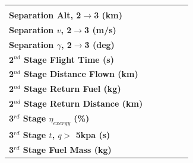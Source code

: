 \begin{table}[ht]
\begin{tabular}{l c c c c c}
		& \textbf{\secondExergyEffMaxTGroundMinTStrat}
		& \textbf{\secondExergyEffMinTGroundMaxTStrat}
		& \textbf{\secondExergyEffMaxTGroundMaxTStrat}
		\\
		\textbf{Separation Alt, 2$\rightarrow$3 (km)}
		& \secondthirdSeparationAltqStandard
		& \secondthirdSeparationAltMinTGroundMinTStrat
		& \secondthirdSeparationAltMaxTGroundMinTStrat
		& \secondthirdSeparationAltMinTGroundMaxTStrat
		& \secondthirdSeparationAltMaxTGroundMaxTStrat
		\\
		\textbf{Separation $v$, 2$\rightarrow$3 (m/s)}
		& \secondthirdSeparationvqStandard
		& \secondthirdSeparationvMinTGroundMinTStrat
		& \secondthirdSeparationvMaxTGroundMinTStrat
		& \secondthirdSeparationvMinTGroundMaxTStrat
		& \secondthirdSeparationvMaxTGroundMaxTStrat
		\\
		\textbf{Separation $\gamma$, 2$\rightarrow$3 (deg)}
		& \secondthirdSeparationgammaqStandard
		& \secondthirdSeparationgammaMinTGroundMinTStrat
		& \secondthirdSeparationgammaMaxTGroundMinTStrat
		& \secondthirdSeparationgammaMinTGroundMaxTStrat
		& \secondthirdSeparationgammaMaxTGroundMaxTStrat
		\\
		\textbf{2$^{nd}$ Stage Flight Time (s)}
		& \secondFlightTimeqStandard
		& \secondFlightTimeMinTGroundMinTStrat
		& \secondFlightTimeMaxTGroundMinTStrat
		& \secondFlightTimeMinTGroundMaxTStrat
		& \secondFlightTimeMaxTGroundMaxTStrat
		\\
		\textbf{2$^{nd}$ Stage Distance Flown (km)}
		& \SecondDistqStandard
		& \SecondDistMinTGroundMinTStrat
		& \SecondDistMaxTGroundMinTStrat
		& \SecondDistMinTGroundMaxTStrat
		& \SecondDistMaxTGroundMaxTStrat
		\\
		\textbf{2$^{nd}$ Stage Return Fuel (kg)}
		& \returnFuelqStandard
		& \returnFuelMinTGroundMinTStrat
		& \returnFuelMaxTGroundMinTStrat
		& \returnFuelMinTGroundMaxTStrat
		& \returnFuelMaxTGroundMaxTStrat
		\\
		\textbf{2$^{nd}$ Stage Return Distance (km)}
		& \returnDistqStandard
		& \returnDistMinTGroundMinTStrat
		& \returnDistMaxTGroundMinTStrat
		& \returnDistMinTGroundMaxTStrat
		& \returnDistMaxTGroundMaxTStrat
		\\
		\hline 
		\textbf{3$^{rd}$ Stage $\eta_{exergy}$ (\%)}
		& \textbf{\thirddExergyEffqStandard}
		& \textbf{\thirddExergyEffMinTGroundMinTStrat}
		& \textbf{\thirddExergyEffMaxTGroundMinTStrat}
		& \textbf{\thirddExergyEffMinTGroundMaxTStrat}
		& \textbf{\thirddExergyEffMaxTGroundMaxTStrat}
		\\
		\textbf{3$^{rd}$ Stage $t$, $q >$ 5kpa (s)}
		& \thirdqOverFiveqStandard
		& \thirdqOverFiveMinTGroundMinTStrat
		& \thirdqOverFiveMaxTGroundMinTStrat
		& \thirdqOverFiveMinTGroundMaxTStrat
		& \thirdqOverFiveMaxTGroundMaxTStrat
		\\
		\textbf{3$^{rd}$ Stage Fuel Mass (kg)}
		& \thirdmFuelqStandard
		& \thirdmFuelMinTGroundMinTStrat
		& \thirdmFuelMaxTGroundMinTStrat
		& \thirdmFuelMinTGroundMaxTStrat
		& \thirdmFuelMaxTGroundMaxTStrat
		\\
		\hline 
	\end{tabular} 
	


\end{table}
